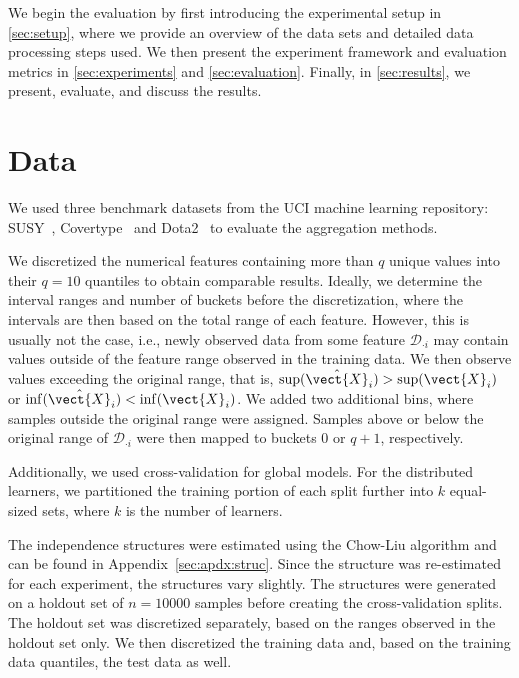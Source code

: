 We begin the evaluation by first introducing the experimental setup in \autoref{sec:setup}, where we provide an overview of the data sets and detailed data processing steps used.
We then present the experiment framework and evaluation metrics in \autoref{sec:experiments} and \autoref{sec:evaluation}.
Finally, in \autoref{sec:results}, we present, evaluate, and discuss the results.

\section{Data}
\label{sec:setup}

We used three benchmark datasets from the UCI machine learning repository: SUSY~\cite{baldi2014searching}, Covertype~\cite{blackard2000comparison} and Dota2~\cite{tridgell2016dota2} to evaluate the aggregation methods.


We discretized the numerical features containing more than $q$ unique values into their $q=10$ quantiles to obtain comparable results.
Ideally, we determine the interval ranges and number of buckets before the discretization, where the intervals are then based on the total range of each feature.
However, this is usually not the case, i.e., newly observed data from some feature $\mathcal{D}_{\cdot i}$ may contain values outside of the feature range observed in the training data. 
We then observe values exceeding the original range, that is, $\sup(\hat{\vect{X}}_i) > \sup(\vect{X}_i) $ or  $\inf(\hat{\vect{X}}_i) < \inf(\vect{X}_i) $.
We added two additional bins, where samples outside the original range were assigned.
Samples above or below the original range of $\mathcal{D}_{\cdot i}$ were then mapped to buckets $0$ or $q+1$, respectively.

Additionally, we used cross-validation for global models. 
For the distributed learners, we partitioned the training portion of each split further into $k$ equal-sized sets, where $k$ is the number of learners.

The independence structures were estimated using the Chow-Liu algorithm and can be found in Appendix~\ref{sec:apdx:struc}.
Since the structure was re-estimated for each experiment, the structures vary slightly.
The structures were generated on a holdout set of $n=10000$ samples before creating the cross-validation splits.
The holdout set was discretized separately, based on the ranges observed in the holdout set only.
We then discretized the training data and, based on the training data quantiles, the test data as well.

